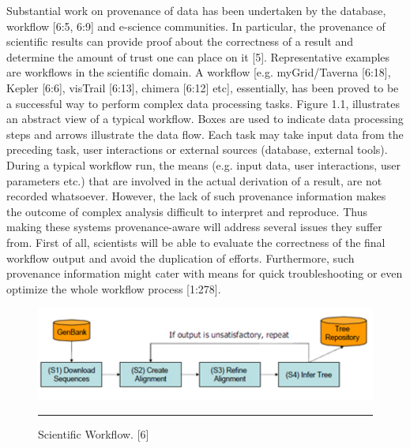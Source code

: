 Substantial work on provenance of data has been undertaken by the database, workflow [6:5, 6:9] and e-science communities.  In particular, the provenance of scientific results can provide proof about the correctness of a result and determine the amount of trust one can place on it [5]. Representative examples are workflows in the scientific domain. A workflow [e.g. myGrid/Taverna [6:18], Kepler [6:6], visTrail [6:13], chimera [6:12] etc], essentially, has been proved to be a successful way to perform complex data processing tasks. Figure 1.1, illustrates an abstract view of a typical workflow. Boxes are used to indicate data processing steps and arrows illustrate the data flow. Each task may take input data from the preceding task, user interactions or external sources (database, external tools).  During a typical workflow run, the means (e.g. input data, user interactions, user parameters etc.) that are involved in the actual derivation of a result, are not recorded whatsoever.  However, the lack of such provenance information makes the outcome of complex analysis difficult to interpret and reproduce. Thus making these systems provenance-aware will address several issues they suffer from. First of all, scientists will be able to evaluate the correctness of the final workflow output and avoid the duplication of efforts. Furthermore, such provenance information might cater with means for quick troubleshooting or even optimize the whole workflow process [1:278].

\begin{figure}[htbp]
	\centering
		\includegraphics{./Figures/figure1.pdf}
		\rule{35em}{0.5pt}
	\caption[Scientific Workflow]{Scientific Workflow. [6]}
	\label{fig:scientificWorkflow}
\end{figure}


